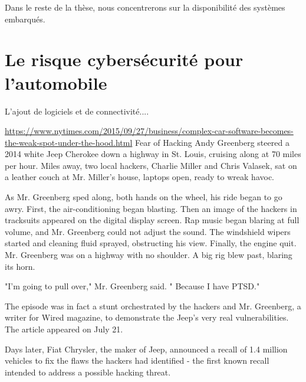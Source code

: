 Dans le reste de la th\`ese, nous concentrerons sur la disponibilit\'e des syst\`emes embarqu\'es. 


\section {Le risque cybers\'ecurit\'e pour l'automobile}
 \medskip
 {\Huge L}'ajout de logiciels et de connectivit\'e....


\begin{tbd}
\url{https://www.nytimes.com/2015/09/27/business/complex-car-software-becomes-the-weak-spot-under-the-hood.html}
Fear of Hacking
Andy Greenberg steered a 2014 white Jeep Cherokee down a highway in St. Louis, cruising along at 70 miles per hour. Miles away, two local hackers, Charlie Miller and Chris Valasek, sat on a leather couch at Mr. Miller's house, laptops open, ready to wreak havoc.

As Mr. Greenberg sped along, both hands on the wheel, his ride began to go awry. First, the air-conditioning began blasting. Then an image of the hackers in tracksuits appeared on the digital display screen. Rap music began blaring at full volume, and Mr. Greenberg could not adjust the sound. The windshield wipers started and cleaning fluid sprayed, obstructing his view. Finally, the engine quit.
Mr. Greenberg was on a highway with no shoulder. A big rig blew past, blaring its horn.

"I'm going to pull over," Mr. Greenberg said. " Because I have PTSD."

The episode was in fact a stunt orchestrated by the hackers and Mr. Greenberg, a writer for Wired magazine, to demonstrate the Jeep's very real vulnerabilities. The article appeared on July 21.

Days later, Fiat Chrysler, the maker of Jeep, announced a recall of 1.4 million vehicles to fix the flaws the hackers had identified - the first known recall intended to address a possible hacking threat.
\end{tbd}
